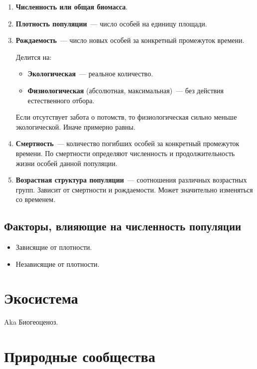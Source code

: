 \documentclass[12pt]{article}
\begin{document}
	\begin{enumerate}
		\item \textbf{Численность или общая биомасса}.
		\item \textbf{Плотность популяции}~--- число особей на единицу площади.
		\item \textbf{Рождаемость}~--- число новых особей за конкретный промежуток времени.
		
		Делится на:
		
		\begin{itemize}
			\item \textbf{Экологическая}~--- реальное количество.
			\item \textbf{Физиологическая} (абсолютная, максимальная)~--- без действия естественного отбора.
		\end{itemize}
		
		Если отсутствует забота о потомств, то физиологическая сильно меньше экологической. Иначе примерно равны.
		
		\item \textbf{Смертность}~--- количество погибших особей за конкретный промежуток времени. По смертности определяют численность и продолжительность жизни особей данной популяции.
		
		\item \textbf{Возрастная структура популяции}~--- соотношения различных возрастных групп. Зависит от смертности и рождаемости. Может значительно изменяться со временем.
	\end{enumerate}
	
	\subsection{Факторы, влияющие на численность популяции}
	
	\begin{itemize}
		\item Зависящие от плотности.
		
		\item Независящие от плотности.
	\end{itemize}
	
	\section{Экосистема}
	
	Aka Биогеоценоз.
	
	\section{Природные сообщества}
	
\end{document}
